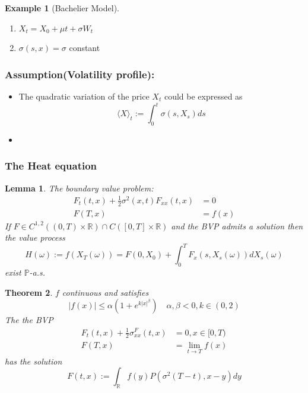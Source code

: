\documentclass[a4paper,11pt]{book}
\newtheorem{theorem}{Theorem}[section]
\newtheorem{lemma}[theorem]{Lemma}
\theoremstyle{definition}
\newtheorem*{example}{Example}
\theoremstyle{remark}
\begin{document}
\begin{example}[Bachelier Model] \quad
\begin{enumerate}
	\item $X_t = X_0 + \mu t + \sigma W_t$
	\item $\sigma(s, x) = \sigma$ constant
\end{enumerate}
\end{example}

\subsubsection*{Assumption(Volatility profile):}
\begin{itemize}
	\item The quadratic variation of the price $X_t$ could be expressed as
\begin{equation*}
	\langle X \rangle_t := \int_0^t \sigma(s, X_s) ds
\end{equation*}
	\item 
\end{itemize}


\subsubsection*{The Heat equation}
\begin{lemma}
	The boundary value problem:
	\begin{align}
		F_t(t, x) + \frac{1}{2} \sigma^2(x, t) F_{xx}(t, x) &= 0\\
		F(T, x) &= f(x)
	\end{align}
	If $F \in C^{1, 2}((0, T) \times \mathbb{R}) \cap C([0, T] \times \mathbb{R})$ and the BVP admits a solution then the value process
	\begin{equation*}
		H(\omega) := f(X_T(\omega)) = F(0, X_0) + \int_0^T F_x (s, X_s(\omega)) dX_s(\omega)
	\end{equation*}
	exist $\mathbb{P}$-a.s.
\end{lemma}

\begin{theorem}
	$f$ continuous and satisfies
	\begin{equation*}
		|f(x)| \leq \alpha ( 1 + e^{k|x|^\beta}) \quad \alpha , \beta < 0, k \in (0, 2)
	\end{equation*}
	The the BVP 
	\begin{align}
		F_t(t, x) + \frac{1}{2} \sigma^ F_{xx}(t, x) &= 0, x \in [0, T)\\
		F(T, x) &= \lim_{t \rightarrow T}f(x)
	\end{align}
	has the solution
	\begin{equation*}
		F(t,x) := \int_\mathbb{R} f(y) P(\sigma^2(T - t), x-y)dy
	\end{equation*}
\end{theorem}
\end{document}
